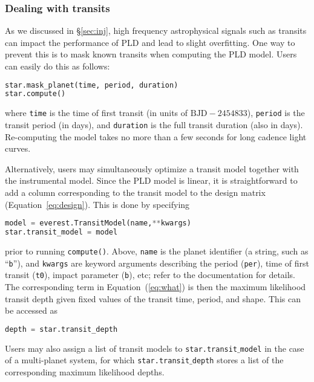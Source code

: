 \documentclass[]{emulateapj}
\newcommand{\edited}[1]{{\color{red} #1}}
\begin{document}
\edited{\subsubsection{Dealing with transits}}
\label{sec:dealing_with_transits}
As we discussed in \S\ref{sec:inj}, high frequency astrophysical signals such
as transits can impact the performance of PLD and lead to slight overfitting.
One way to prevent this is to mask known transits when computing the PLD
model. Users can easily do this as follows:
%
\begin{lstlisting}[language=Python]
star.mask_planet(time, period, duration)
star.compute()
\end{lstlisting}
%
where \texttt{time} is the time of first transit (in units of $\mathrm{BJD} - 2454833$),
\texttt{period} is the transit period (in days), and \texttt{duration} is the full
transit duration (also in days). Re-computing the model takes no more than
a few seconds for long cadence light curves.

Alternatively, users may simultaneously optimize a transit model together
with the instrumental model. Since the PLD model is linear, it is straightforward
to add a column corresponding to the transit model to the design matrix
(Equation~\ref{eq:design}). This is done by specifying
%
\begin{lstlisting}[language=Python]
model = everest.TransitModel(name,**kwargs)
star.transit_model = model
\end{lstlisting}
%
prior to running \texttt{compute()}. Above, \texttt{name} is the
planet identifier (a string, such as ``\texttt{b}''),
and \texttt{kwargs} are keyword arguments describing the
period (\texttt{per}), time of first transit (\texttt{t0}),
impact parameter (\texttt{b}), etc; refer to the documentation for details.
%
The corresponding term in Equation~(\ref{eq:what}) is then
the maximum likelihood transit depth given fixed values of the transit time,
period, and shape. This can be accessed as
%
\begin{lstlisting}[language=Python]
depth = star.transit_depth
\end{lstlisting}
%
Users may also assign a list of transit models to \texttt{star.transit$\_$model} in
the case of a multi-planet system, for which \texttt{star.transit$\_$depth} stores
a list of the corresponding maximum likelihood depths.
\end{document}
